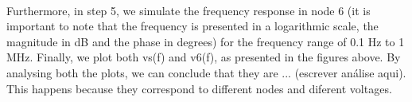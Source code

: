 \paragraph{}
Furthermore, in step 5, we simulate the frequency response in node 6 (it is important to note that the frequency is presented in a logarithmic scale, the magnitude in dB and the phase in degrees) for the frequency range of 0.1 Hz to 1 MHz. Finally, we plot both vs(f) and v6(f), as presented in the figures above. By analysing both the plots, we can conclude that they are ... (escrever análise aqui). This happens because they correspond to different nodes and diferent voltages.

\pagebreak
